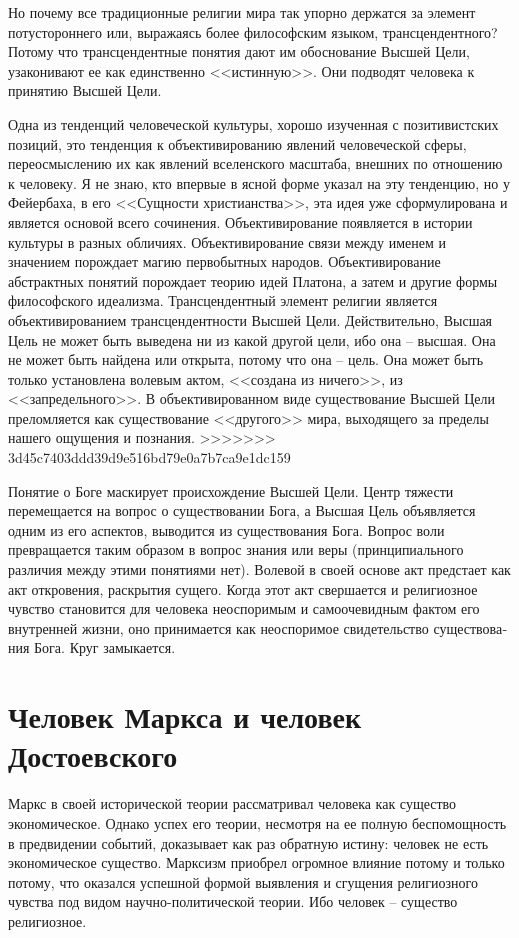 \documentclass{book}
\begin{document}
Но почему все традиционные религии мира так упорно держатся за элемент потустороннего или, выражаясь более философским языком, трансцендентного? Потому что трансцендентные понятия дают им обоснование Высшей Цели, узаконивают ее как единственно <<истинную>>. Они подводят человека к принятию Высшей Цели.

Одна из тенденций человеческой культуры, хорошо изучен­ная с позитивистских позиций, это тенденция к объективированию  явлений человеческой сферы, переосмыслению их как яв­лений вселенского масштаба, внешних по отношению к чело­веку. Я не знаю, кто впервые в ясной форме указал на эту тен­денцию, но у Фейербаха, в его <<Сущности христианства>>, эта идея уже сформулирована и является основой всего сочинения. Объективирование появляется в истории культуры в разных обличиях. Объективирование связи между именем и значением порождает магию первобытных народов. Объективирование абстрактных понятий порождает теорию идей Платона, а затем и другие формы философского идеализма. Трансцендентный элемент религии является объективированием трансцендент­ности Высшей Цели. Действительно, Высшая Цель не может быть выведена ни из какой другой цели, ибо она -- высшая. Она не может быть найдена или открыта, потому что она -- цель. Она может быть только установлена волевым актом, <<создана из ничего>>, из <<запредельного>>. В 
объективирован­ном виде существование Высшей Цели преломляется как су­ществование <<другого>> мира, выходящего за пределы нашего ощущения и познания.
>>>>>>> 3d45c7403ddd39d9e516bd79e0a7b7ca9e1dc159

Понятие о Боге маскирует происхождение Высшей Цели. Центр тяжести перемещается на вопрос о существовании  Бога, а Высшая Цель объявляется одним из его аспектов, выводится из существования Бога. Вопрос воли  превращается таким обра­зом в вопрос знания  или веры  (принципиального различия между этими понятиями нет). Волевой в своей основе акт предстает как акт откровения, раскрытия сущего. Когда этот акт свершается и религиозное чувство становится для человека неоспоримым и самоочевидным фактом его внутренней жизни, оно принимается как неоспоримое свидетельство существова­ния Бога. Круг замыкается. 


\section{Человек Маркса и человек Достоевского}

Маркс в своей исторической теории рассматривал человека как существо экономическое.  Однако успех его теории, несмот­ря на ее полную беспомощность в предвидении событий, дока­зывает как раз обратную истину: человек не есть экономиче­ское существо. Марксизм приобрел огромное влияние потому и только потому, что оказался успешной формой выявления и сгущения религиозного чувства под видом научно-политической теории. Ибо человек -- существо религиозное.
\end{document}
